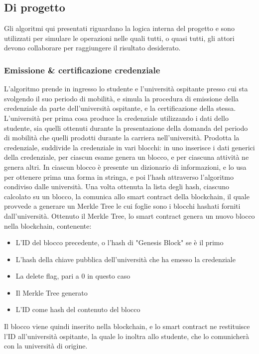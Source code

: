 \documentclass[a4paper,12pt]{article}
\begin{document}
\subsection{Di progetto}
Gli algoritmi qui presentati riguardano la logica interna del progetto e sono utilizzati per simulare le operazioni nelle quali tutti, o quasi tutti, gli attori devono collaborare per raggiungere il risultato desiderato. 
\subsubsection{Emissione \& certificazione credenziale}
L'algoritmo prende in ingresso lo studente e l'università ospitante presso cui sta svolgendo il suo periodo di mobilità, e simula la procedura di emissione della credenziale da parte dell'università ospitante, e la certificazione della stessa. L'università per prima cosa produce la credenziale utilizzando i dati dello studente, sia quelli ottenuti durante la presentazione della domanda del periodo di mobilità che quelli prodotti durante la carriera nell'università. Prodotta la credenziale, suddivide la credenziale in vari blocchi: in uno inserisce i dati generici della credenziale, per ciascun esame genera un blocco, e per ciascuna attività ne genera altri. In ciascun blocco è presente un dizionario di informazioni, e lo usa per ottenere prima una forma in stringa, e poi l'hash attraverso l'algoritmo condiviso dalle università. Una volta ottenuta la lista degli hash, ciascuno calcolato su un blocco, la comunica allo smart contract della blockchain, il quale provvede a generare un Merkle Tree le cui foglie sono i blocchi hashati forniti dall'università. Ottenuto il Merkle Tree, lo smart contract genera un nuovo blocco nella blockchain, contenente:
\begin{itemize}
    \item L'ID del blocco precedente, o l'hash di "Genesis Block" se è il primo
    \item L'hash della chiave pubblica dell'università che ha emesso la credenziale
    \item La delete flag, pari a 0 in questo caso
    \item Il Merkle Tree generato
    \item L'ID come hash del contenuto del blocco
\end{itemize}
Il blocco viene quindi inserito nella blockchain, e lo smart contract ne restituisce l'ID all'università ospitante, la quale lo inoltra allo studente, che lo comunicherà con la università di origine.
\end{document}
